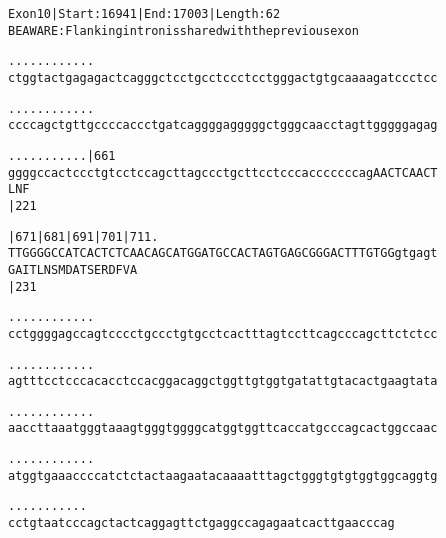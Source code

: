 \documentclass{article}
\begin{document}
\newpage
\begin{alltt}
Exon 10 | Start: 16941 | End: 17003 | Length: 62
BE AWARE: Flanking intron is shared with the previous exon

.    .    .    .    .    .    .    .    .    .    .    .    
ctggtactgagagactcagggctcctgcctccctcctgggactgtgcaaaagatccctcc

.    .    .    .    .    .    .    .    .    .    .    .    
ccccagctgttgccccaccctgatcaggggagggggctgggcaacctagttgggggagag

.    .    .    .    .    .    .    .    .    .    .     |661
ggggccactccctgtcctccagcttagccctgcttcctcccacccccccagAACTCAACT
                                                     L  N  F
                                                        |221

      |671      |681      |691      |701      |711        . 
TTGGGGCCATCACTCTCAACAGCATGGATGCCACTAGTGAGCGGGACTTTGTGGgtgagt
  G  A  I  T  L  N  S  M  D  A  T  S  E  R  D  F  V  A      
                          |231                              

   .    .    .    .    .    .    .    .    .    .    .    . 
cctggggagccagtcccctgccctgtgcctcactttagtccttcagcccagcttctctcc

   .    .    .    .    .    .    .    .    .    .    .    . 
agtttcctcccacacctccacggacaggctggttgtggtgatattgtacactgaagtata

   .    .    .    .    .    .    .    .    .    .    .    . 
aaccttaaatgggtaaagtgggtggggcatggtggttcaccatgcccagcactggccaac

   .    .    .    .    .    .    .    .    .    .    .    . 
atggtgaaaccccatctctactaagaatacaaaatttagctgggtgtgtggtggcaggtg

   .    .    .    .    .    .    .    .    .    .    .
cctgtaatcccagctactcaggagttctgaggccagagaatcacttgaacccag
\end{alltt}
\newpage
\end{document}
